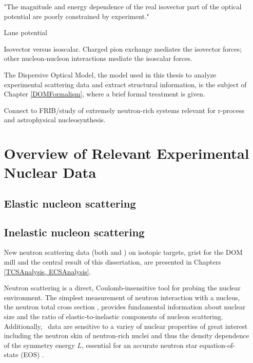 "The magnitude and energy dependence of the real isovector part of the
optical potential are poorly constrained by experiment." \cite{Holt16}

Lane potential 

Isovector versus isoscalar. Charged pion exchange mediates the isovector forces;
other nucleon-nucleon interactions mediate the isoscalar forces.

The Dispersive Optical Model, the model used in this thesis to analyze experimental scattering data
and extract structural information, is the subject of Chapter \ref{DOMFormalism}, where a brief
formal treatment is given.

Connect to FRIB/study of extremely neutron-rich systems relevant for r-process
and astrophysical nucleosynthesis.

\section{Overview of Relevant Experimental Nuclear Data}
\subsection{Elastic nucleon scattering}
\subsection{Inelastic nucleon scattering}

New neutron scattering data (both \tot and \el) on isotopic targets, grist for the DOM mill and the 
central result of this dissertation, are presented in Chapters \ref{TCSAnalysis, ECSAnalysis}.

Neutron scattering is a direct, Coulomb-insensitive tool for probing the nuclear
environment. The simplest measurement of neutron interaction with a nucleus,
the neutron total cross section \tot, provides fundamental information about
nuclear size and the ratio of elastic-to-inelastic components of nucleon 
scattering. Additionally, \tot\ data are sensitive to a variey of nuclear
properties of great interest including the neutron skin of neutron-rich nuclei
\cite{Mahzoon2017} and thus the density dependence of the symmetry energy $L$,
essential for an accurate neutron star equation-of-state (EOS)
\cite{Fattoyev2012, Vinas2014, Brown2000}.

